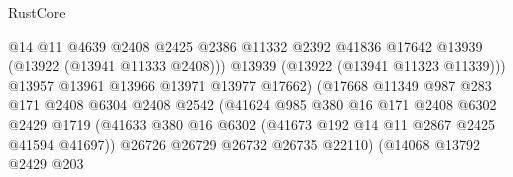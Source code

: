 \begin{lexlean}{RustCore}
\begin{coremodule}
                                            @14
                                            @11
                                            @4639
                                            @2408
                                            @2425
                                            @2386
                                            @11332
                                            @2392
                                            @41836
                                            @17642
                                            @13939
                                            (@13922 (@13941 @11333 @2408)))
                                          @13939
                                          (@13922 (@13941 @11323 @11339)))
                                        @13957
                                        @13961
                                        @13966
                                        @13971
                                        @13977
                                        @17662)
                                      (@17668
                                        @11349
                                        @987
                                        @283
                                        @171
                                        @2408
                                        @6304
                                        @2408
                                        @2542
                                        (@41624
                                          @985
                                          @380
                                          @16
                                          @171
                                          @2408
                                          @6302
                                          @2429
                                          @1719
                                          (@41633
                                            @380
                                            @16
                                            @6302
                                            (@41673 @192 @14 @11 @2867 @2425 @41594 @41697))
                                          @26726
                                          @26729
                                          @26732
                                          @26735
                                          @22110)
                                        (@14068
                                          @13792
                                          @2429
                                          @203

\end{coremodule}
\end{lexlean}
